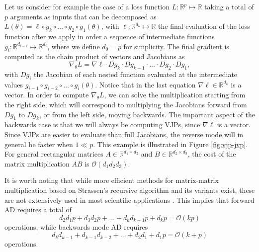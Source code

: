 Let us consider for example the case of a loss function $L : \mathbb R^p \mapsto \mathbb R$ taking a total of $p$ arguments as inputs that can be decomposed as $L(\theta) = \ell \circ g_{k} \circ \ldots \circ g_2 \circ g_1(\theta)$, with $\ell : \mathbb R^{d_k} \mapsto \mathbb R$ the final evaluation of the loss function after we apply in order a sequence of intermediate functions $g_i : \mathbb R^{d_{i-1}} \mapsto \mathbb R^{d_i}$, where we define $d_0 = p$ for simplicity. 
The final gradient is computed as the chain product of vectors and Jacobians as
\begin{equation}
 \nabla_\theta L = \nabla \ell \cdot Dg_{k} \cdot Dg_{k-1} \cdot \ldots \cdot Dg_2 \cdot Dg_1, 
\end{equation}
with $Dg_i$ the Jacobian of each nested function evaluated at the intermediate values $g_{i-1} \circ g_{i-2} \circ \ldots \circ g_i (\theta)$.
Notice that in the last equation $\nabla \ell \in \mathbb R^{d_k}$ is a vector.
In order to compute $\nabla_\theta L$, we can solve the multiplication starting from the right side, which will correspond to multiplying the Jacobians forward from $Dg_1$ to $Dg_k$, or from the left side, moving backwards. 
The important aspect of the backwards case is that we will always be computing VJPs, 
since $\nabla \ell$ is a vector.
Since VJPs are easier to evaluate than full Jacobians, the reverse mode will in general be faster when $1 \ll p$. This example is illustrated in Figure \ref{fig:vjp-jvp}. 
For general rectangular matrices $A\in \mathbb R^{d_1 \times d_2}$ and $B \in \mathbb R^{d_2 \times d_3}$, the cost of the matrix multiplication $AB$ is $\mathcal O (d_1 d_2 d_3)$.

It is worth noting that while more efficient methods for matrix-matrix multiplication based on Strassen’s recursive algorithm and its variants exist, these are not extensively used in most scientific applications \cite{Silva_Gustafson_Wong_2018, Huang_Smith_Henry_Geijn_2016}.
This implies that forward AD requires a total of
\begin{equation}
 d_2 d_1 p + d_3 d_2 p + \ldots + d_k d_{k-1} p + d_k p = \mathcal O (kp)
\end{equation}
operations, while backwards mode AD requires
\begin{equation}
 d_k d_{k-1} + d_{k-1} d_{k-2} + \ldots + d_2 d_1 + d_1 p = \mathcal O (k+p)
\end{equation}
operations. 

